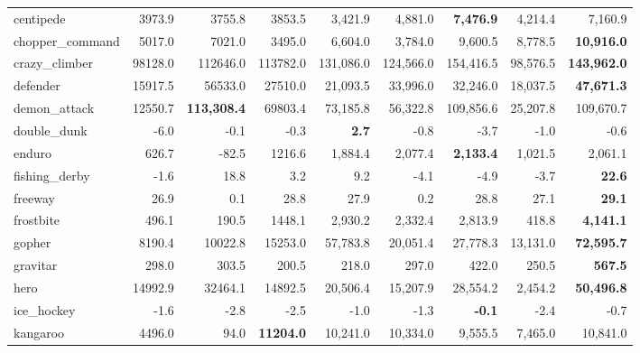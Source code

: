 \documentclass[letterpaper]{article} \usepackage{aaai18}  \usepackage{times}  \usepackage{helvet}  \usepackage{courier}  \usepackage{url}  \usepackage{graphicx}  \usepackage{amsmath,amssymb}
\begin{document}
\begin{table*}[t]
{\begin{tabular}{l|rrrrrrrr}
         centipede &    3973.9 &    3755.8 &    3853.5 &     3,421.9 &    4,881.0 &       {\bf  7,476.9 }&    4,214.4 &    7,160.9 \\
   chopper\_command &    5017.0 &    7021.0 &    3495.0 &     6,604.0 &    3,784.0 &        9,600.5 &    8,778.5 &  {\bf  10,916.0 }\\
     crazy\_climber &   98128.0 &  112646.0 &  113782.0 &   131,086.0 &  124,566.0 &      154,416.5 &   98,576.5 &  {\bf 143,962.0 }\\
          defender &   15917.5 &   56533.0 &   27510.0 &    21,093.5 &   33,996.0 &       32,246.0 &   18,037.5 &  {\bf  47,671.3 }\\
      demon\_attack &   12550.7 & {\bf 113,308.4 }&   69803.4 &    73,185.8 &   56,322.8 &      109,856.6 &   25,207.8 &  109,670.7 \\
       double\_dunk &      -6.0 &      -0.1 &      -0.3 &        {\bf  2.7} &       -0.8 &           -3.7 &       -1.0 &       -0.6 \\
            enduro &     626.7 &     -82.5 &    1216.6 &     1,884.4 &    2,077.4 &       {\bf  2,133.4 }&    1,021.5 &    2,061.1 \\
     fishing\_derby &      -1.6 &      18.8 &       3.2 &         9.2 &       -4.1 &           -4.9 &       -3.7 &      {\bf  22.6 }\\
           freeway &      26.9 &       0.1 &      28.8 &        27.9 &        0.2 &           28.8 &       27.1 &    {\bf    29.1 }\\
         frostbite &     496.1 &     190.5 &    1448.1 &     2,930.2 &    2,332.4 &        2,813.9 &      418.8 &   {\bf  4,141.1} \\
            gopher &    8190.4 &   10022.8 &   15253.0 &    57,783.8 &   20,051.4 &       27,778.3 &   13,131.0 & {\bf   72,595.7 }\\
          gravitar &     298.0 &     303.5 &     200.5 &       218.0 &      297.0 &          422.0 &      250.5 &   {\bf    567.5 }\\
              hero &   14992.9 &   32464.1 &   14892.5 &    20,506.4 &   15,207.9 &       28,554.2 &    2,454.2 &  {\bf  50,496.8 }\\
        ice\_hockey &      -1.6 &      -2.8 &      -2.5 &        -1.0 &       -1.3 &          {\bf  -0.1} &       -2.4 &       -0.7 \\
          kangaroo &    4496.0 &      94.0 &  {\bf  11204.0 }&    10,241.0 &   10,334.0 &        9,555.5 &    7,465.0 &   10,841.0 \\

\end{tabular}}
\end{table*}
\end{document}

